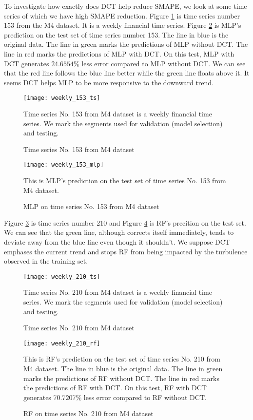 To investigate how exactly does DCT help reduce SMAPE, we look at some time series of which we have high SMAPE reduction. Figure \ref{fig: weekly 153 ts} is time series number 153 from the M4 dataset. It is a weekly financial time series. Figure \ref{fig: weekly 153 mlp} is MLP's prediction on the test set of time series number 153. The line in blue is the original data. The line in green marks the predictions of MLP without DCT. The line in red marks the predictions of MLP with DCT. On this test, MLP with DCT generates $24.6554\%$ less error compared to MLP without DCT. We can see that the red line follows the blue line better while the green line floats above it. It seems DCT helps MLP to be more responsive to the downward trend.
\begin{figure}[H]
    \centering
    \texttt{[image: weekly\_153\_ts]}
    \caption{Time series No. 153 from M4 dataset}
    {\raggedright \footnotesize Time series No. 153 from M4 dataset is a weekly financial time series. We mark the segments used for validation (model selection) and testing.\par}
    \label{fig: weekly 153 ts}
\end{figure}
\begin{figure}[H]
    \centering
    \texttt{[image: weekly\_153\_mlp]}
    \caption{MLP on time series No. 153 from M4 dataset}
    {\raggedright \footnotesize This is MLP's prediction on the test set of time series No. 153 from M4 dataset.  \par}
    \label{fig: weekly 153 mlp}
\end{figure}
Figure \ref{fig: weekly 210 ts} is time series number 210 and Figure \ref{fig: weekly 210 rf} is RF's precition on the test set. We can see that the green line, although corrects itself immediately, tends to deviate away from the blue line even though it shouldn't. We suppose DCT emphases the current trend and stops RF from being impacted by the turbulence observed in the training set.
\begin{figure}[H]
    \centering
    \texttt{[image: weekly\_210\_ts]}
    \caption{Time series No. 210 from M4 dataset}
    {\raggedright \footnotesize Time series No. 210 from M4 dataset is a weekly financial time series. We mark the segments used for validation (model selection) and testing.\par}
    \label{fig: weekly 210 ts}
\end{figure}
\begin{figure}[H]
    \centering
    \texttt{[image: weekly\_210\_rf]}
    \caption{RF on time series No. 210 from M4 dataset}
    {\raggedright \footnotesize This is RF's prediction on the test set of time series No. 210 from M4 dataset. The line in blue is the original data. The line in green marks the predictions of RF without DCT. The line in red marks the predictions of RF with DCT. On this test, RF with DCT generates $70.7207\%$ less error compared to RF without DCT. \par}
    \label{fig: weekly 210 rf}
\end{figure}

